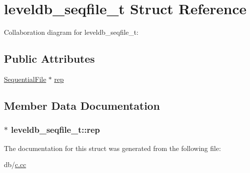 \hypertarget{structleveldb__seqfile__t}{\section{leveldb\-\_\-seqfile\-\_\-t Struct Reference}
\label{structleveldb__seqfile__t}
}


Collaboration diagram for leveldb\-\_\-seqfile\-\_\-t\-:
\subsection*{Public Attributes}
\begin{DoxyCompactItemize}
\item 
\hyperlink{classleveldb_1_1_sequential_file}{Sequential\-File} $\ast$ \hyperlink{structleveldb__seqfile__t_a84b4a8638a6ad109e65b3c7923fde915}{rep}
\end{DoxyCompactItemize}


\subsection{Member Data Documentation}
\hypertarget{structleveldb__seqfile__t_a84b4a8638a6ad109e65b3c7923fde915}{
\subsubsection[{rep}]{$\ast$ leveldb\-\_\-seqfile\-\_\-t\-::rep}}\label{structleveldb__seqfile__t_a84b4a8638a6ad109e65b3c7923fde915}


The documentation for this struct was generated from the following file\-:\begin{DoxyCompactItemize}
\item 
db/\hyperlink{c_8cc}{c.\-cc}\end{DoxyCompactItemize}
